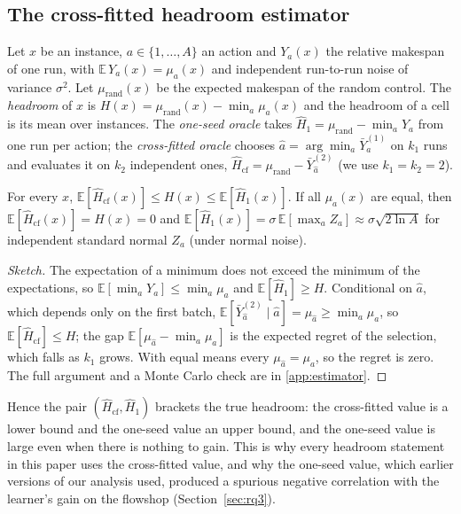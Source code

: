 \subsection{The cross-fitted headroom estimator}
\label{sec:estimator}
Let $x$ be an instance, $a\in\{1,\dots,A\}$ an action and $Y_a(x)$ the relative makespan of one run, with $\mathbb E\,Y_a(x)=\mu_a(x)$ and independent run-to-run noise of variance $\sigma^2$. Let $\mu_{\mathrm{rand}}(x)$ be the expected makespan of the random control. The \emph{headroom} of $x$ is $H(x)=\mu_{\mathrm{rand}}(x)-\min_a\mu_a(x)$ and the headroom of a cell is its mean over instances. The \emph{one-seed oracle} takes $\hat H_1=\mu_{\mathrm{rand}}-\min_aY_a$ from one run per action; the \emph{cross-fitted oracle} chooses $\hat a=\arg\min_a\bar Y_a^{(1)}$ on $k_1$ runs and evaluates it on $k_2$ independent ones, $\hat H_{\mathrm{cf}}=\mu_{\mathrm{rand}}-\bar Y_{\hat a}^{(2)}$ (we use $k_1=k_2=2$).

\begin{proposition}
\label{prop:bounds}
For every $x$, $\mathbb E[\hat H_{\mathrm{cf}}(x)]\le H(x)\le\mathbb E[\hat H_1(x)]$. If all $\mu_a(x)$ are equal, then $\mathbb E[\hat H_{\mathrm{cf}}(x)]=H(x)=0$ and $\mathbb E[\hat H_1(x)]=\sigma\,\mathbb E[\max_{a}Z_a]\approx\sigma\sqrt{2\ln A}$ for independent standard normal $Z_a$ (under normal noise).
\end{proposition}
\begin{proof}[Sketch]
The expectation of a minimum does not exceed the minimum of the expectations, so $\mathbb E[\min_aY_a]\le\min_a\mu_a$ and $\mathbb E[\hat H_1]\ge H$. Conditional on $\hat a$, which depends only on the first batch, $\mathbb E[\bar Y_{\hat a}^{(2)}\mid\hat a]=\mu_{\hat a}\ge\min_a\mu_a$, so $\mathbb E[\hat H_{\mathrm{cf}}]\le H$; the gap $\mathbb E[\mu_{\hat a}-\min_a\mu_a]$ is the expected regret of the selection, which falls as $k_1$ grows. With equal means every $\mu_{\hat a}=\mu_a$, so the regret is zero. The full argument and a Monte Carlo check are in \ref{app:estimator}.
\end{proof}
Hence the pair $(\hat H_{\mathrm{cf}},\hat H_1)$ brackets the true headroom: the cross-fitted value is a lower bound and the one-seed value an upper bound, and the one-seed value is large even when there is nothing to gain. This is why every headroom statement in this paper uses the cross-fitted value, and why the one-seed value, which earlier versions of our analysis used, produced a spurious negative correlation with the learner's gain on the flowshop (Section~\ref{sec:rq3}).

